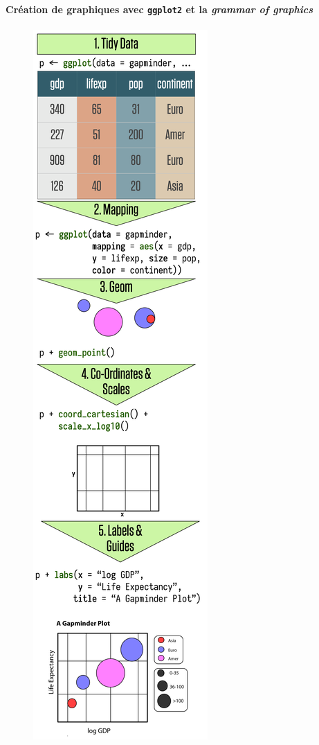 \clearpage
\paragraph*{Création de graphiques avec \texttt{ggplot2} et la \og \textit{grammar of graphics}\fg{}}

\paragraph*{}
\begin{figure}
\centering
\includegraphics[width=.92\linewidth]{img/ch-03-ggplot-flow-vertical.png}

\end{figure}
